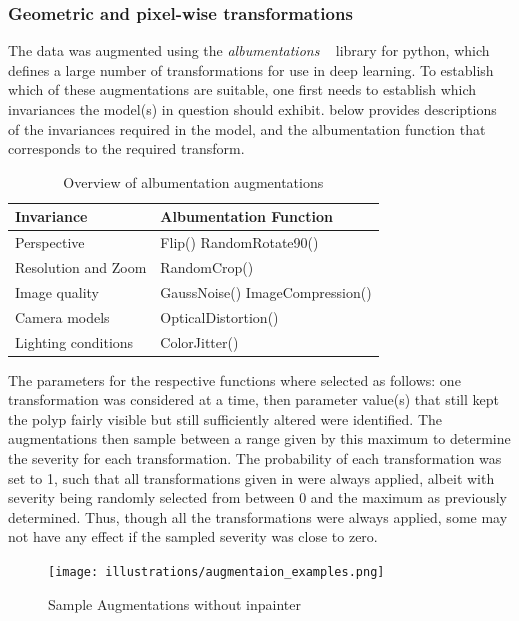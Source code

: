 \subsubsection{Geometric and pixel-wise transformations}
The data was augmented using the \textit{albumentations} ~\cite{albumentations} library for python, which defines a large number of transformations for use in deep learning. To establish which of these augmentations are suitable, one first needs to establish which invariances the model(s) in question should exhibit.  below provides descriptions of the invariances required in the model, and the albumentation function that corresponds to the required transform. 
\begin{table}[ht]
    \centering
\begin{tabularx}{\textwidth}{|X|X|}
    \toprule
    \textbf{Invariance} & \textbf{Albumentation Function}\\
    \midrule
    Perspective &Flip() \newline RandomRotate90()\\
    Resolution and Zoom & RandomCrop() \\
    Image quality &GaussNoise() \newline ImageCompression()\\
    Camera models&OpticalDistortion() \\
    Lighting conditions & ColorJitter() \\
    \bottomrule
\end{tabularx}
    \caption{Overview of albumentation augmentations}
    \label{tab:vanilla_aug}
\end{table}

The parameters for the respective functions where selected as follows: one transformation was considered at a time, then parameter value(s) that still kept the polyp fairly visible but still sufficiently altered were identified. The augmentations then sample between a range given by this maximum to determine the severity for each transformation. The probability of each transformation was set to 1, such that all transformations given in  were always applied, albeit with severity being randomly selected from between 0 and the maximum as previously determined. Thus, though all the transformations were always applied, some may not have any effect if the sampled severity was close to zero. 

\begin{figure}
    \centering
    \texttt{[image: illustrations/augmentaion\_examples.png]}
    \caption{Sample Augmentations without inpainter}
    \label{fig:my_label}
\end{figure}

